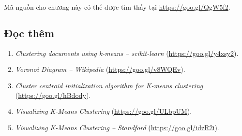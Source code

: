Mã nguồn cho chương này có thể được tìm thấy tại \url{https://goo.gl/QgW5f2}.



\subsection{Đọc thêm}

\begin{enumerate}
\item \textit{Clustering documents using k-means -- scikit-learn} (\url{https://goo.gl/y4xsy2}).

\item \textit{Voronoi Diagram -- Wikipedia} (\url{https://goo.gl/v8WQEv}).

\item \textit{Cluster centroid initialization algorithm for K-means clustering} (\url{https://goo.gl/hBdody}).

\item \textit{Visualizing K-Means Clustering} (\url{https://goo.gl/ULbpUM}).

\item \textit{Visualizing K-Means Clustering -- Standford} (\url{https://goo.gl/idzR2i}).

\end{enumerate}

